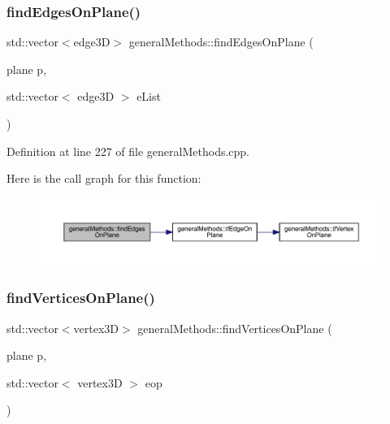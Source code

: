\mbox{\label{namespacegeneral_methods_abf0a07083176ad5167f5ed4c89b5c5cb}} 
\subsubsection{\texorpdfstring{find\+Edges\+On\+Plane()}{findEdgesOnPlane()}}
{\footnotesize\ttfamily std\+::vector$<$edge3D$>$ general\+Methods\+::find\+Edges\+On\+Plane (\begin{DoxyParamCaption}\item[{plane}]{p,  }\item[{std\+::vector$<$ edge3D $>$}]{e\+List }\end{DoxyParamCaption})}



Definition at line 227 of file general\+Methods.\+cpp.

Here is the call graph for this function\+:
\nopagebreak
\begin{figure}[H]
\begin{center}
\leavevmode
\includegraphics[width=350pt]{namespacegeneral_methods_abf0a07083176ad5167f5ed4c89b5c5cb_cgraph}
\end{center}
\end{figure}
\mbox{\label{namespacegeneral_methods_acc1b72abf045cf0d466f2829134e7d66}} 
\subsubsection{\texorpdfstring{find\+Vertices\+On\+Plane()}{findVerticesOnPlane()}}
{\footnotesize\ttfamily std\+::vector$<$vertex3D$>$ general\+Methods\+::find\+Vertices\+On\+Plane (\begin{DoxyParamCaption}\item[{plane}]{p,  }\item[{std\+::vector$<$ vertex3D $>$}]{eop }\end{DoxyParamCaption})}



